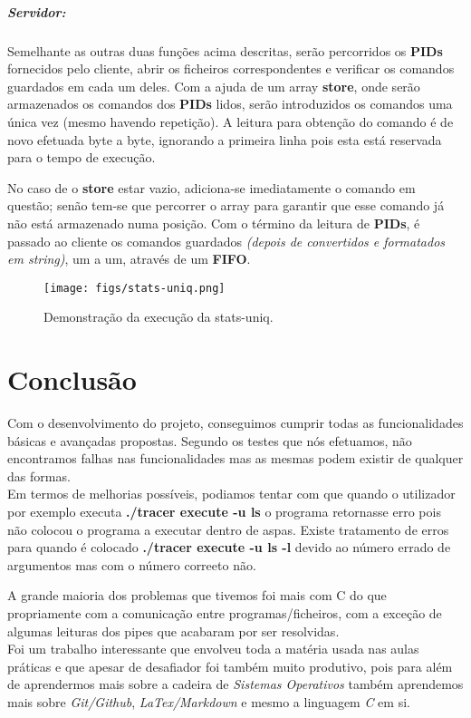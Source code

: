 \documentclass{report}
\begin{document}
\subparagraph{Servidor:}
Semelhante as outras duas funções acima descritas, serão percorridos os \textbf{PIDs} fornecidos pelo cliente, abrir os ficheiros correspondentes e verificar os comandos guardados em cada um deles. Com a ajuda de um array \textbf{store}, onde serão armazenados os comandos dos \textbf{PIDs} lidos, serão introduzidos os comandos uma única vez (mesmo havendo repetição). A leitura para obtenção do comando é de novo efetuada byte a byte, ignorando a primeira linha pois esta está reservada para o tempo de execução.\par
No caso de o \textbf{store} estar vazio, adiciona-se imediatamente o comando em questão; senão tem-se que percorrer o array para garantir que esse comando já não está armazenado numa posição.
Com o término da leitura de \textbf{PIDs}, é passado ao cliente os comandos guardados \textit{(depois de convertidos e formatados em string)}, um a um, através de um \textbf{FIFO}. 

\begin{figure}[h]
    \centering
    \texttt{[image: figs/stats-uniq.png]}
    \caption{Demonstração da execução da stats-uniq.}
    \label{f}
\end{figure}

\newpage
\section{Conclusão}
Com o desenvolvimento do projeto, conseguimos cumprir todas as funcionalidades básicas e avançadas propostas. Segundo os testes que nós efetuamos, não encontramos falhas nas funcionalidades mas as mesmas podem existir de qualquer das formas.\\

Em termos de melhorias possíveis, podiamos tentar com que quando o utilizador por exemplo executa \textbf{./tracer execute -u ls} o programa retornasse erro pois não colocou o programa a executar dentro de aspas. Existe tratamento de erros para quando é colocado \textbf{./tracer execute -u ls -l} devido ao número errado de argumentos mas com o número correeto não.\par
A grande maioria dos problemas que tivemos foi mais com C do que propriamente com a comunicação entre programas/ficheiros, com a exceção de algumas leituras dos pipes que acabaram por ser resolvidas.\\

Foi um trabalho interessante que envolveu toda a matéria usada nas aulas práticas e que apesar de desafiador foi também muito produtivo, pois para além de aprendermos mais sobre a cadeira de \textit{Sistemas Operativos} também aprendemos mais sobre \textit{Git/Github}, \textit{LaTex/Markdown} e mesmo a linguagem \textit{C} em si.
\end{document}
